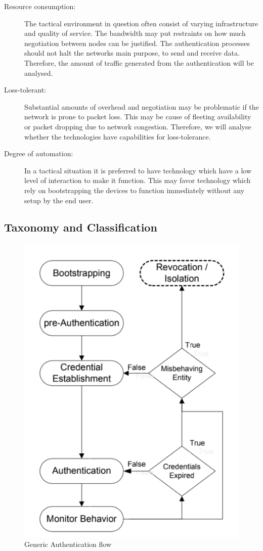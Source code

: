 \begin{description}
    \item[Resource consumption:] The tactical environment in question often consist of varying infrastructure and quality of service. The bandwidth may put restraints on how much negotiation between nodes can be justified. The authentication processes should not halt the networks main purpose, to send and receive data. Therefore, the amount of traffic generated from the authentication will be analysed.

    \item[Loss-tolerant:] Substantial amounts of overhead and negotiation may be problematic if the network is prone to packet loss. This may be cause of fleeting availability or packet dropping due to network congestion. Therefore, we will analyse whether the technologies have capabilities for loss-tolerance.

    \item[Degree of automation:] In a tactical situation it is preferred to have technology which have a low level of interaction to make it function. This may favor technology which rely on bootstrapping the devices to function immediately without any setup by the end user.
\end{description}
\subsection{Taxonomy and Classification}
\begin{figure}[!h]
    \label{uvmodel}
    \centering
    \includegraphics[scale=0.5]{appendices/Authentication_flow_chart.png}
    \caption{Generic Authentication flow \cite{DBLP:conf/mswim/AboudaggaREDQ05}}
\end{figure}

